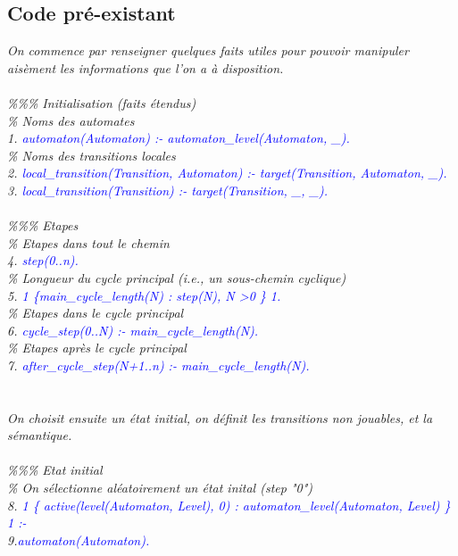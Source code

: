 \documentclass[12pt,a4paper]{article}
\begin{document}
\subsection{Code pré-existant}
\emph{
	On commence par renseigner quelques faits utiles pour pouvoir manipuler aisèment les informations que l'on a à disposition.\\ \\
	\%\%\% Initialisation (faits étendus)\\
	\% Noms des automates\\
	1. \textcolor{blue}{automaton(Automaton) :- automaton\_level(Automaton, \_).}\\
	\% Noms des transitions locales\\
	2. \textcolor{blue}{local\_transition(Transition, Automaton) :- target(Transition, Automaton, \_).}\\
	3. \textcolor{blue}{local\_transition(Transition) :- target(Transition, \_, \_).}\\ \\
	\%\%\% Etapes\\
	\% Etapes dans tout le chemin\\
	4. \textcolor{blue}{step(0..n).}\\
	\% Longueur du cycle principal (i.e., un sous-chemin cyclique)\\
	5. \textcolor{blue}{1 \{main\_cycle\_length(N) : step(N), N \textgreater 0 \} 1.}\\
	\% Etapes dans le cycle principal\\
	6. \textcolor{blue}{cycle\_step(0..N) :- main\_cycle\_length(N).}\\
	\% Etapes après le cycle principal\\
	7. \textcolor{blue}{after\_cycle\_step(N+1..n) :- main\_cycle\_length(N).}\\ \\ \\
	On choisit ensuite un état initial, on définit les transitions non jouables, et la sémantique.\\ \\
	\%\%\% Etat initial\\
	\% On sélectionne aléatoirement un état inital (step "0")\\
	8. \textcolor{blue}{1 \{ active(level(Automaton, Level), 0) : automaton\_level(Automaton, Level) \} 1 :-}\\
	9.\qquad\qquad\textcolor{blue}{automaton(Automaton).}\\ \\
}
\end{document}
